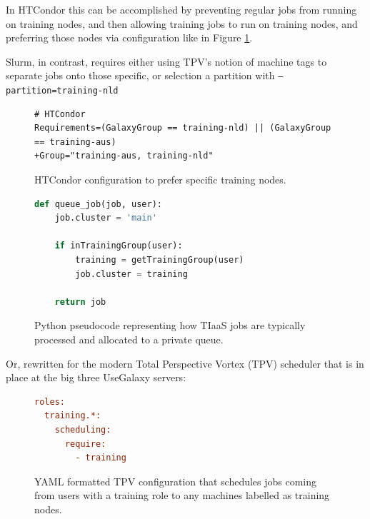 \documentclass[a4paper,num-refs]{oup-contemporary}
\begin{document}
In HTCondor this can be accomplished by preventing regular jobs from running on training nodes, and then allowing training jobs to run on training nodes, and preferring those nodes via configuration like in Figure \ref{code:condorprefer}.

Slurm, in contrast, requires either using TPV's notion of machine tags to separate jobs onto those specific, or selection a partition with \texttt{--partition=training-nld}

\begin{figure}[!ht]
\centering
\begin{lstlisting}[frame=single]  % Start your code-block
# HTCondor
Requirements=(GalaxyGroup == training-nld) || (GalaxyGroup == training-aus)
+Group="training-aus, training-nld"
\end{lstlisting}
\caption{HTCondor configuration to prefer specific training nodes.\label{code:condorprefer}}
\end{figure}



\begin{figure}[!ht]
\centering
\begin{lstlisting}[frame=single,language=Python]  % Start your code-block
def queue_job(job, user):
    job.cluster = 'main'

    if inTrainingGroup(user):
        training = getTrainingGroup(user)
        job.cluster = training

    return job
\end{lstlisting}
\caption{Python pseudocode representing how TIaaS jobs are typically processed and allocated to a private queue.\label{code:scheduler}}
\end{figure}

Or, rewritten for the modern Total Perspective Vortex (TPV) scheduler that is in place at the big three UseGalaxy servers:

\begin{figure}[!ht]
\centering
\begin{lstlisting}[frame=single,language=ini]  % Start your code-block
roles:
  training.*:
    scheduling:
      require:
        - training
\end{lstlisting}
\caption{YAML formatted TPV configuration that schedules jobs coming from users with a training role to any machines labelled as training nodes.\label{code:tpv}}
\end{figure}
\end{document}
